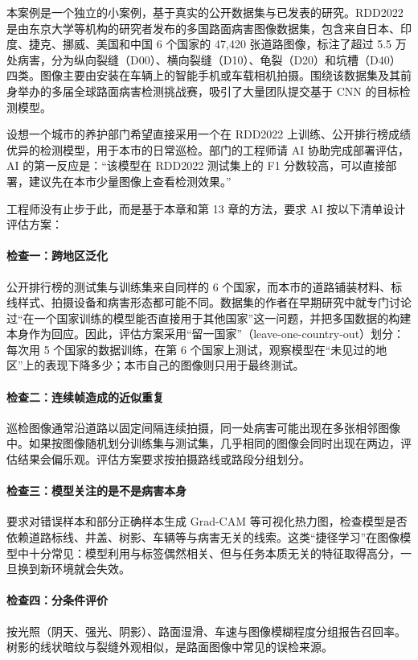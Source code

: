 本案例是一个独立的小案例，基于真实的公开数据集与已发表的研究。RDD2022 是由东京大学等机构的研究者发布的多国路面病害图像数据集，包含来自日本、印度、捷克、挪威、美国和中国 6 个国家的 47,420 张道路图像，标注了超过 5.5 万处病害，分为纵向裂缝（D00）、横向裂缝（D10）、龟裂（D20）和坑槽（D40）四类\cite{arya2022rdd}。图像主要由安装在车辆上的智能手机或车载相机拍摄。围绕该数据集及其前身举办的多届全球路面病害检测挑战赛，吸引了大量团队提交基于 CNN 的目标检测模型。

设想一个城市的养护部门希望直接采用一个在 RDD2022 上训练、公开排行榜成绩优异的检测模型，用于本市的日常巡检。部门的工程师请 AI 协助完成部署评估，AI 的第一反应是：“该模型在 RDD2022 测试集上的 F1 分数较高，可以直接部署，建议先在本市少量图像上查看检测效果。”

工程师没有止步于此，而是基于本章和第 13 章的方法，要求 AI 按以下清单设计评估方案：

\paragraph{检查一：跨地区泛化} 公开排行榜的测试集与训练集来自同样的 6 个国家，而本市的道路铺装材料、标线样式、拍摄设备和病害形态都可能不同。数据集的作者在早期研究中就专门讨论过“在一个国家训练的模型能否直接用于其他国家”这一问题，并把多国数据的构建本身作为回应\cite{arya2021multicountry}。因此，评估方案采用“留一国家”（leave-one-country-out）划分：每次用 5 个国家的数据训练，在第 6 个国家上测试，观察模型在“未见过的地区”上的表现下降多少；本市自己的图像则只用于最终测试。

\paragraph{检查二：连续帧造成的近似重复} 巡检图像通常沿道路以固定间隔连续拍摄，同一处病害可能出现在多张相邻图像中。如果按图像随机划分训练集与测试集，几乎相同的图像会同时出现在两边，评估结果会偏乐观。评估方案要求按拍摄路线或路段分组划分。

\paragraph{检查三：模型关注的是不是病害本身} 要求对错误样本和部分正确样本生成 Grad-CAM 等可视化热力图，检查模型是否依赖道路标线、井盖、树影、车辆等与病害无关的线索。这类“捷径学习”在图像模型中十分常见：模型利用与标签偶然相关、但与任务本质无关的特征取得高分，一旦换到新环境就会失效\cite{geirhos2020shortcut,lapuschkin2019clever}。

\paragraph{检查四：分条件评价} 按光照（阴天、强光、阴影）、路面湿滑、车速与图像模糊程度分组报告召回率。树影的线状暗纹与裂缝外观相似，是路面图像中常见的误检来源。

